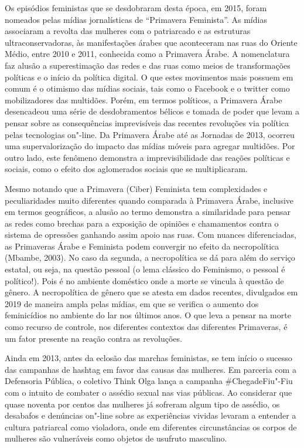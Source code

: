 Os episódios feministas que se desdobraram desta época, em 2015, foram
nomeados pelas mídias jornalísticas de ``Primavera Feminista''. As
mídias associaram a revolta das mulheres com o patriarcado e as
estruturas ultraconservadoras, às manifestações árabes que aconteceram
nas ruas do Oriente Médio, entre 2010 e 2011, conhecida como a Primavera
Árabe. A nomenclatura faz alusão a superestimação das redes e das ruas
como meios de transformações políticas e o início da política digital. O
que estes movimentos mais possuem em comum é o otimismo das mídias
sociais, tais como o Facebook e o twitter como mobilizadores das
multidões. Porém, em termos políticos, a Primavera Árabe desencadeou uma
série de desdobramentos bélicos e tomada de poder que levam a pensar
sobre as consequências imprevisíveis das recentes revoluções via
política pelas tecnologias on"-line. Da Primavera Árabe até as Jornadas
de 2013, ocorreu uma supervalorização do impacto das mídias móveis para
agregar multidões. Por outro lado, este fenômeno demonstra a
imprevisibilidade das reações políticas e sociais, como o efeito dos
aglomerados sociais que se multiplicaram.

Mesmo notando que a Primavera (Ciber) Feminista tem complexidades e
peculiaridades muito diferentes quando comparada à Primavera Árabe,
inclusive em termos geográficos, a alusão ao termo demonstra a
similaridade para pensar as redes como brechas para a exposição de
opiniões e chamamentos contra o sistema de opressões ganhando assim
apoio nas ruas. Com nuances diferenciadas, as Primaveras Árabe e
Feminista podem convergir no efeito da necropolítica (Mbambe, 2003). No
caso da segunda, a necropolítica se dá para além do serviço estatal, ou
seja, na questão pessoal (o lema clássico do Feminismo, o pessoal é
político!). Pois é no ambiente doméstico onde a morte se vincula à
questão de gênero. A necropolítica de gênero que se atesta em dados
recentes, divulgados em 2019 de maneira ampla pelas mídias, em que se
verifica o aumento dos feminicídios no ambiente do lar nos últimos anos.
O que leva a pensar na morte como recurso de controle, nos diferentes
contextos das diferentes Primaveras, é um fator presente na reação
contra as revoluções.

Ainda em 2013, antes da eclosão das marchas feministas, se tem início o
sucesso das campanhas de hashtag em favor das causas das mulheres. Em
parceria com a Defensoria Pública, o coletivo Think Olga lança a
campanha \#ChegadeFiu"-Fiu com o intuito de combater o assédio sexual nas
vias públicas. Ao considerar que quase noventa por centos das mulheres
já sofreram algum tipo de assédio, os desabafos e denúncias on"-line
sobre as experiências vividas levaram a entender a cultura patriarcal
como violadora, onde em diferentes circunstâncias os corpos de mulheres
são vulneráveis como objetos de usufruto masculino.

